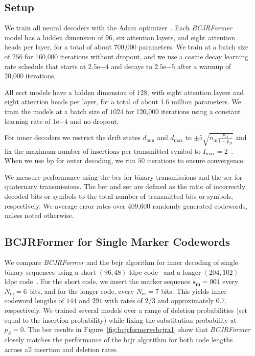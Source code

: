 \documentclass[conference,letterpaperu]{IEEEtran}
\newcommand{\expnumber}[2]{{#1}\mathrm{e}{#2}}
\newcommand{\pdel}{\ensuremath{p_D}}
\newcommand{\psub}{\ensuremath{p_S}}
\newcommand{\nin}{\ensuremath{n_{\text{in}}}}
\newcommand{\marker}{\ensuremath{\bm{s_{\text{m}}}}}
\newcommand{\markerFreq}{\ensuremath{N_{\text{m}}}}
\begin{document}
\subsection{Setup}
We train all neural decoders with the Adam optimizer~\cite{adamAMethodForStoachsticOptimization}. Each \textit{BCJRFormer} model has a hidden dimension of $96$, six attention layers, and eight attention heads per layer, for a total of about 700{,}000 parameters. We train at a batch size of $256$ for 160{,}000 iterations without dropout, and we use a cosine decay learning rate schedule that starts at $\expnumber{2.5}{-4}$ and decays to $\expnumber{2.5}{-5}$ after a warmup of 20{,}000 iterations.

All \ac{ecct} models have a hidden dimension of $128$, with eight attention layers and eight attention heads per layer, for a total of about 1.6 million parameters. We train the models at a batch size of $1024$ for 120{,}000 iterations using a constant learning rate of $\expnumber{1}{-4}$ and no dropout.

For inner decoders we restrict the drift states $d_{\min}$ and $d_{\max}$ to $\pm 5 \sqrt{\nin \frac{\pdel}{1 - \pdel}}$ and fix the maximum number of insertions per transmitted symbol to $I_{\max} = 2$~\cite{daveyReliableCommunicationChannels2001}. When we use \ac{bp} for outer decoding, we run $50$ iterations to ensure convergence. 

We measure performance using the \acf{ber} for binary transmissions and the \acf{ser} for quaternary transmissions. The \acl{ber} and \acl{ser} are defined as the ratio of incorrectly decoded bits or symbols to the total number of transmitted bits or symbols, respectively. We average error rates over 409{,}600 randomly generated codewords, unless noted otherwise. 


\subsection{BCJRFormer for Single Marker Codewords}
\label{sec:ExperimentBCJRDecoderSingle}

We compare \textit{BCJRFormer} and the \ac{bcjr} algorithm for inner decoding of single binary sequences using a short \((96, 48)\) \ac{ldpc} code~\cite{channelcodes} and a longer \((204, 102)\) \ac{ldpc} code~\cite{mackayEncyclopediaSparseGraph}. For the short code, we insert the marker sequence \(\marker = 001\) every \(\markerFreq = 6\) bits, and for the longer code, every \(\markerFreq = 7\) bits. This yields inner codeword lengths of $144$ and $291$ with rates of \(2/3\) and approximately $0.7$, respectively. We trained several models over a range of deletion probabilities (set equal to the insertion probability) while fixing the substitution probability at \(\psub = 0\). The \ac{ber} results in Figure~\ref{fig:bcjrformervsbcjra1} show that \textit{BCJRFormer} closely matches the performance of the \ac{bcjr} algorithm for both code lengths across all insertion and deletion rates.
\end{document}
